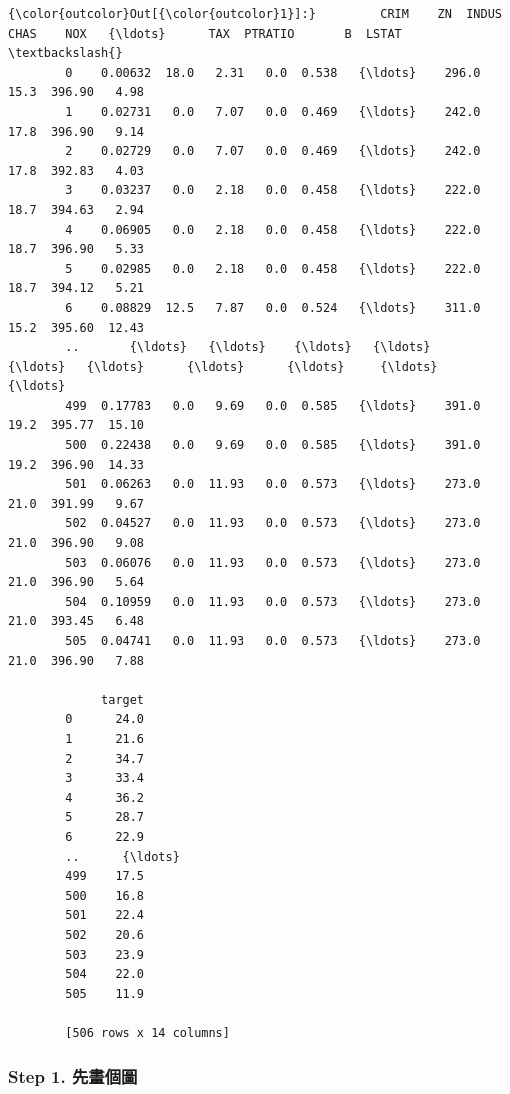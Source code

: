 \documentclass[11pt]{ctexart}
\begin{document}
\begin{Verbatim}[commandchars=\\\{\}]
{\color{outcolor}Out[{\color{outcolor}1}]:}         CRIM    ZN  INDUS  CHAS    NOX   {\ldots}      TAX  PTRATIO       B  LSTAT  \textbackslash{}
        0    0.00632  18.0   2.31   0.0  0.538   {\ldots}    296.0     15.3  396.90   4.98   
        1    0.02731   0.0   7.07   0.0  0.469   {\ldots}    242.0     17.8  396.90   9.14   
        2    0.02729   0.0   7.07   0.0  0.469   {\ldots}    242.0     17.8  392.83   4.03   
        3    0.03237   0.0   2.18   0.0  0.458   {\ldots}    222.0     18.7  394.63   2.94   
        4    0.06905   0.0   2.18   0.0  0.458   {\ldots}    222.0     18.7  396.90   5.33   
        5    0.02985   0.0   2.18   0.0  0.458   {\ldots}    222.0     18.7  394.12   5.21   
        6    0.08829  12.5   7.87   0.0  0.524   {\ldots}    311.0     15.2  395.60  12.43   
        ..       {\ldots}   {\ldots}    {\ldots}   {\ldots}    {\ldots}   {\ldots}      {\ldots}      {\ldots}     {\ldots}    {\ldots}   
        499  0.17783   0.0   9.69   0.0  0.585   {\ldots}    391.0     19.2  395.77  15.10   
        500  0.22438   0.0   9.69   0.0  0.585   {\ldots}    391.0     19.2  396.90  14.33   
        501  0.06263   0.0  11.93   0.0  0.573   {\ldots}    273.0     21.0  391.99   9.67   
        502  0.04527   0.0  11.93   0.0  0.573   {\ldots}    273.0     21.0  396.90   9.08   
        503  0.06076   0.0  11.93   0.0  0.573   {\ldots}    273.0     21.0  396.90   5.64   
        504  0.10959   0.0  11.93   0.0  0.573   {\ldots}    273.0     21.0  393.45   6.48   
        505  0.04741   0.0  11.93   0.0  0.573   {\ldots}    273.0     21.0  396.90   7.88   
        
             target  
        0      24.0  
        1      21.6  
        2      34.7  
        3      33.4  
        4      36.2  
        5      28.7  
        6      22.9  
        ..      {\ldots}  
        499    17.5  
        500    16.8  
        501    22.4  
        502    20.6  
        503    23.9  
        504    22.0  
        505    11.9  
        
        [506 rows x 14 columns]
\end{Verbatim}
            
    \hypertarget{step-1.-ux5148ux756bux500bux5716}{%
\subsubsection{Step 1.
先畫個圖}\label{step-1.-ux5148ux756bux500bux5716}}
\end{document}
